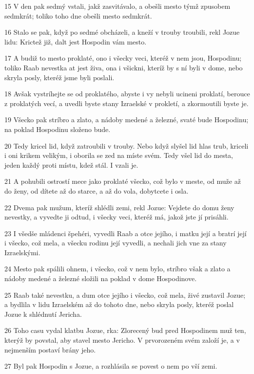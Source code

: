 \par 15 V den pak sedmý vstali, jakž zasvitávalo, a obešli mesto týmž zpusobem sedmkrát; toliko toho dne obešli mesto sedmkrát.
\par 16 Stalo se pak, když po sedmé obcházeli, a kneží v trouby troubili, rekl Jozue lidu: Krictež již, dalt jest Hospodin vám mesto.
\par 17 A budiž to mesto proklaté, ono i všecky veci, kteréž v nem jsou, Hospodinu; toliko Raab nevestka at jest živa, ona i všickni, kteríž by s ní byli v dome, nebo skryla posly, kteréž jsme byli poslali.
\par 18 Avšak vystríhejte se od proklatého, abyste i vy nebyli ucineni proklatí, berouce z proklatých vecí, a uvedli byste stany Izraelské v prokletí, a zkormoutili byste je.
\par 19 Všecko pak stríbro a zlato, a nádoby medené a železné, svaté bude Hospodinu; na poklad Hospodinu složeno bude.
\par 20 Tedy kricel lid, když zatroubili v trouby. Nebo když slyšel lid hlas trub, kriceli i oni krikem velikým, i oborila se zed na míste svém. Tedy všel lid do mesta, jeden každý proti místu, kdež stál. I vzali je.
\par 21 A pohubili ostrostí mece jako proklaté všecko, což bylo v meste, od muže až do ženy, od dítete až do starce, a až do vola, dobytcete i osla.
\par 22 Dvema pak mužum, kteríž shlédli zemi, rekl Jozue: Vejdete do domu ženy nevestky, a vyvedte ji odtud, i všecky veci, kteréž má, jakož jste jí prisáhli.
\par 23 I všedše mládenci špehéri, vyvedli Raab a otce jejího, i matku její a bratrí její i všecko, což mela, a všecku rodinu její vyvedli, a nechali jich vne za stany Izraelskými.
\par 24 Mesto pak spálili ohnem, i všecko, což v nem bylo, stríbro však a zlato a nádoby medené a železné složili na poklad v dome Hospodinove.
\par 25 Raab také nevestku, a dum otce jejího i všecko, což mela, živé zustavil Jozue; a bydlila v lidu Izraelském až do tohoto dne, nebo skryla posly, kteréž poslal Jozue k shlédnutí Jericha.
\par 26 Toho casu vydal klatbu Jozue, rka: Zlorecený bud pred Hospodinem muž ten, kterýž by povstal, aby stavel mesto Jericho. V prvorozeném svém založí je, a v nejmenším postaví brány jeho.
\par 27 Byl pak Hospodin s Jozue, a rozhlásila se povest o nem po vší zemi.

